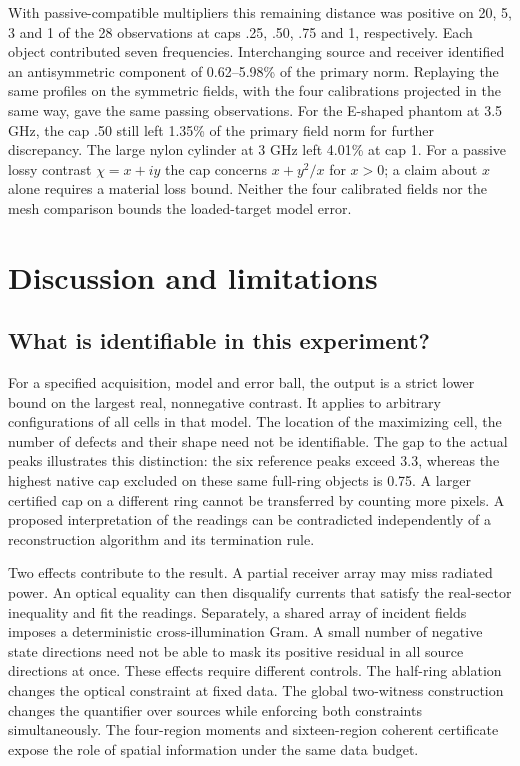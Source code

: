 \documentclass[anonymous,12pt]{iopjournal}
\theoremstyle{remark}\newtheorem{remark}[theorem]{Remark}
\numberwithin{equation}{section}
\begin{document}
With passive-compatible multipliers this remaining distance was positive on 20, 5, 3 and 1 of the 28 observations at caps .25, .50, .75 and 1, respectively. Each object contributed seven frequencies. Interchanging source and receiver identified an antisymmetric component of 0.62--5.98\% of the primary norm. Replaying the same profiles on the symmetric fields, with the four calibrations projected in the same way, gave the same passing observations. For the E-shaped phantom at 3.5 GHz, the cap .50 still left 1.35\% of the primary field norm for further discrepancy. The large nylon cylinder at 3 GHz left 4.01\% at cap 1. For a passive lossy contrast $\chi=x+iy$ the cap concerns $x+y^2/x$ for $x>0$; a claim about $x$ alone requires a material loss bound. Neither the four calibrated fields nor the mesh comparison bounds the loaded-target model error.

\section{Discussion and limitations}\label{sec:discuss}

\subsection{What is identifiable in this experiment?}
For a specified acquisition, model and error ball, the output is a strict lower bound on the largest real, nonnegative contrast. It applies to arbitrary configurations of all cells in that model. The location of the maximizing cell, the number of defects and their shape need not be identifiable. The gap to the actual peaks illustrates this distinction: the six reference peaks exceed 3.3, whereas the highest native cap excluded on these same full-ring objects is 0.75. A larger certified cap on a different ring cannot be transferred by counting more pixels. A proposed interpretation of the readings can be contradicted independently of a reconstruction algorithm and its termination rule.

Two effects contribute to the result. A partial receiver array may miss radiated power. An optical equality can then disqualify currents that satisfy the real-sector inequality and fit the readings. Separately, a shared array of incident fields imposes a deterministic cross-illumination Gram. A small number of negative state directions need not be able to mask its positive residual in all source directions at once. These effects require different controls. The half-ring ablation changes the optical constraint at fixed data. The global two-witness construction changes the quantifier over sources while enforcing both constraints simultaneously. The four-region moments and sixteen-region coherent certificate expose the role of spatial information under the same data budget.
\end{document}
